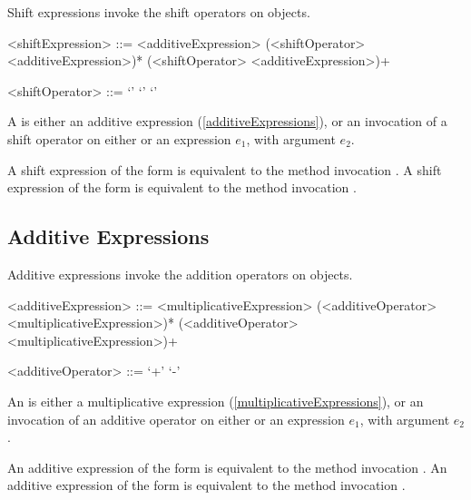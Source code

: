 \documentclass[makeidx]{article}
\begin{document}
{\LMHash{}%
Shift expressions invoke the shift operators on objects.

\begin{grammar}
<shiftExpression> ::= \gnewline{}
  <additiveExpression> (<shiftOperator> <additiveExpression>)*
  \alt \SUPER{} (<shiftOperator> <additiveExpression>)+

<shiftOperator> ::= `\ltlt'
  \alt `\gtgtgt'
  \alt `\gtgt'
\end{grammar}

\LMHash{}%
A  is either an additive expression
(\ref{additiveExpressions}),
or an invocation of a shift operator
on either \SUPER{} or an expression $e_1$,
with argument $e_2$.

\LMHash{}%
A shift expression of the form 
is equivalent to the method invocation .
A shift expression of the form 
is equivalent to the method invocation .



\subsection{Additive Expressions}

\LMHash{}%
Additive expressions invoke the addition operators on objects.

\begin{grammar}
<additiveExpression> ::= <multiplicativeExpression>
  \gnewline{} (<additiveOperator> <multiplicativeExpression>)*
  \alt \SUPER{} (<additiveOperator> <multiplicativeExpression>)+

<additiveOperator> ::= `+'
  \alt `-'
\end{grammar}

\LMHash{}%
An  is either a multiplicative expression
(\ref{multiplicativeExpressions}),
or an invocation of an additive operator
on either \SUPER{} or an expression $e_1$,
with argument $e_2$.

\LMHash{}%
An additive expression of the form 
is equivalent to the method invocation .
An additive expression of the form 
is equivalent to the method invocation .

}
\end{document}

